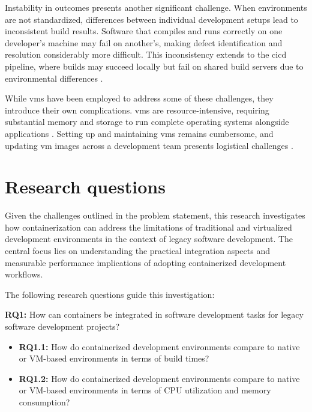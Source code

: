 Instability in outcomes presents another significant challenge.
When environments are not standardized, differences between individual development setups lead to inconsistent build results.
Software that compiles and runs correctly on one developer's machine may fail on another's, making defect identification and resolution considerably more difficult.
This inconsistency extends to the \ac{cicd} pipeline, where builds may succeed locally but fail on shared build servers due to environmental differences \citep{humbleContinuousDeliveryReliable2011}.

While \acp{vm} have been employed to address some of these challenges, they introduce their own complications.
\acp{vm} are resource-intensive, requiring substantial memory and storage to run complete operating systems alongside applications \citep{kolyasnikovExperimentalEvaluationVirtual2019}.
Setting up and maintaining \acp{vm} remains cumbersome, and updating \ac{vm} images across a development team presents logistical challenges \citep{ionescuAlternativesRunningLinux2019}.

\section{Research questions}
\label{sec:research_questions}

Given the challenges outlined in the problem statement, this research investigates how containerization can address the limitations of traditional and virtualized development environments in the context of legacy software development.
The central focus lies on understanding the practical integration aspects and measurable performance implications of adopting containerized development workflows.

The following research questions guide this investigation:

\textbf{RQ1:} How can containers be integrated in software development tasks for legacy software development projects?

\begin{itemize}
	\item \textbf{RQ1.1:} How do containerized development environments compare to native or VM-based environments in terms of build times?
	\item \textbf{RQ1.2:} How do containerized development environments compare to native or VM-based environments in terms of CPU utilization and memory consumption?
\end{itemize}

